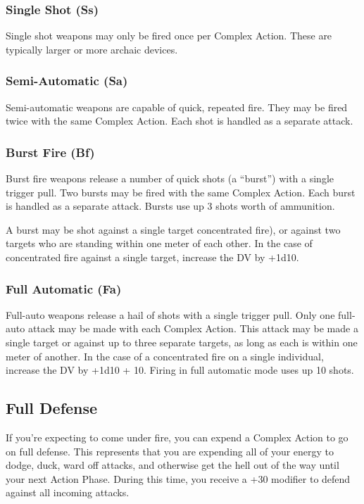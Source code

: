 \subsubsection{Single Shot (Ss)}

Single shot weapons may only be fired once per 
Complex Action. These are typically larger or more 
archaic devices.

\subsubsection{Semi-Automatic (Sa)}

Semi-automatic weapons are capable of quick, repeated
fire. They may be fired twice with the same
Complex Action. Each shot is handled as a separate 
attack.

\subsubsection{Burst Fire (Bf)}

Burst fire weapons release a number of quick shots 
(a ``burst'') with a single trigger pull. Two bursts may 
be fired with the same Complex Action. Each burst 
is handled as a separate attack. Bursts use up 3 shots 
worth of ammunition.

A burst may be shot against a single target concentrated
fire), or against two targets who are standing
within one meter of each other. In the case of concentrated
fire against a single target, increase the DV by
+1d10.

\subsubsection{Full Automatic (Fa)}

Full-auto weapons release a hail of shots with a single 
trigger pull. Only one full-auto attack may be made 
with each Complex Action. This attack may be made a 
single target or against up to three separate targets, as 
long as each is within one meter of another. In the case 
of a concentrated fire on a single individual, increase 
the DV by +1d10 + 10. Firing in full automatic mode 
uses up 10 shots.

\subsection{Full Defense}

If you're expecting to come under fire, you can 
expend a Complex Action to go on full defense. This 
represents that you are expending all of your energy 
to dodge, duck, ward off attacks, and otherwise get 
the hell out of the way until your next Action Phase. 
During this time, you receive a +30 modifier to defend 
against all incoming attacks.

